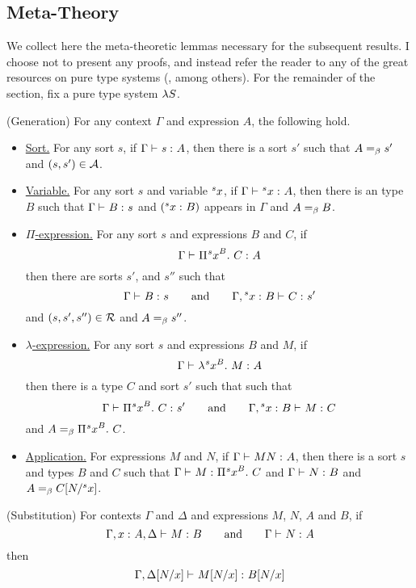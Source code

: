 \documentclass{article}
\begin{document}
\subsection{Meta-Theory}

We collect here the meta-theoretic lemmas necessary for the subsequent results.
I choose not to present any proofs, and instead refer the reader to any of the great resources on pure type systems (\cite{barendregt-1993, barthe-et-al-2001, kamareddine-et-al-2004}, among others).
For the remainder of the section, fix a pure type system $\lambda S$.

\begin{lemma}
\label{lem:generation}
(Generation)
For any context $\Gamma$ and expression $A$, the following hold.
\begin{itemize}
\item \underline{Sort.} For any sort $s$, if $\Gamma \vdash_{} {{s} :^{} {A}}$, then there is a sort $s'$ such that $A =_\beta s'$ and $(s, s') \in \mathcal A$.
\item \underline{Variable.} For any sort $s$ and variable ${}^{s}{x}$, if $\Gamma \vdash_{} {{{}^{s}{x}} :^{} {A}}$, then there is an type $B$ such that $\Gamma \vdash_{} {{B} :^{} {s}}$ and $({{{}^{s}{x}} :^{} {B}})$ appears in $\Gamma$ and $A =_\beta B$.
\item \underline{$\Pi$-expression.} For any sort $s$ and expressions $B$ and $C$, if
\[
    \Gamma \vdash_{} {{{\Pi^{} {{}^{s}{x}}^{B}. \ {C}}} :^{} {A}}
\]
then there are sorts $s'$, and $s''$ such that
\[
    \Gamma \vdash_{} {{B} :^{} {s}} \qquad \text{and} \qquad \Gamma, {{{}^{s}{x}} :^{} {B}} \vdash_{} {{C} :^{} {s'}}
\]
and $(s, s', s'') \in \mathcal R$ and $A =_\beta s''$.
\item \underline{$\lambda$-expression.} For any sort $s$ and expressions $B$ and $M$, if
\[
\Gamma \vdash_{} {{\lambda^{} {}^{s}{x}^{B}. \ M} :^{} {A}}
\]
then there is a type $C$ and sort $s'$ such that such that
\[
\Gamma \vdash_{} {{{\Pi^{} {{}^{s}{x}}^{B}. \ {C}}} :^{} {s'}} \qquad \text{and} \qquad \Gamma, {{{}^{s}{x}} :^{} {B}} \vdash_{} {{M} :^{} {C}}
\]
and $A =_\beta {\Pi^{} {{}^{s}{x}}^{B}. \ {C}}$.
\item \underline{Application.} For expressions $M$ and $N$, if $\Gamma \vdash_{} {{MN} :^{} {A}}$, then there is a sort $s$ and types $B$ and $C$ such that $\Gamma \vdash_{} {{M} :^{} {{\Pi^{} {{}^{s}{x}}^{B}. \ {C}}}}$ and $\Gamma \vdash_{} {{N} :^{} {B}}$ and $A =_\beta C[N/{}^{s}{x}]$.
\end{itemize}
\end{lemma}


\begin{lemma}
\label{lem:substition}
(Substitution)
For contexts $\Gamma$ and $\Delta$ and expressions $M$, $N$, $A$ and $B$, if
\[
    \Gamma, {{x} :^{} {A}}, \Delta \vdash_{} {{M} :^{} {B}} \qquad \text{and} \qquad \Gamma \vdash_{} {{N} :^{} {A}}
\]
then
\[
    \Gamma, \Delta[N/x] \vdash_{} {{M[N/x]} :^{} {B[N/x]}}
\]
\end{lemma}
\end{document}
